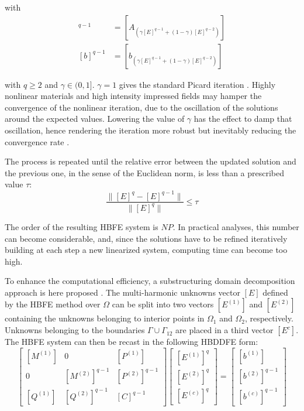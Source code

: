 \documentclass[journal]{IEEEtran}
\begin{document}
\noindent with 
%
\begin{align}
[A]^{q-1} &= [A_{(\gamma [E]^{q-1} + (1-\gamma) [E]^{q-2})}] \\
[b]^{q-1} &= [b_{(\gamma [E]^{q-1} + (1-\gamma) [E]^{q-2})}]
\end{align}

\noindent with $q \geq 2$ and
$\gamma\in(0,1]$. $\gamma=1$ gives the standard Picard iteration \cite{Guarnieri2010}. Highly nonlinear materials and high intensity impressed fields may hamper the convergence of the nonlinear iteration, due to
the oscillation of the solutions around the expected values. Lowering the value
of $\gamma$ has the effect to damp that oscillation, hence rendering the
iteration more robust but inevitably reducing the convergence rate \cite{Silvester1997}.

The process is repeated until the relative error between the updated solution
and the previous one, in the sense of the Euclidean norm, is less than a
prescribed value $\tau$:
%
\begin{equation}
\frac{\|[E]^{q} - [E]^{q-1} \|}{\| [E]^{q} \|} \leq \tau
\end{equation}

The order of the resulting HBFE system is $N P$. In practical analyses, this
number can become considerable, and, since the
solutions have to be refined iteratively building at each step a new linearized
system, computing time can become too high.

To enhance the computational efficiency, a substructuring domain decomposition
approach is here proposed \cite{Saad2000, Toselli2005, Guarnieri2009,
Guarnieri2010}. The multi-harmonic unknowns vector $[E]$ defined by the HBFE method
over $\Omega$ can be split into two vectors $[E^{(1)}]$ and $[E^{(2)}]$
containing the unknowns belonging to interior points in $\Omega_1$ and
$\Omega_2$, respectively. Unknowns belonging to the boundaries
$\Gamma\cup\Gamma_{12}$ are placed in a third vector $[E^c]$. The HBFE system
can then be recast in the following HBDDFE form:
%
\begin{equation}\label{eq:DD}
\begin{bmatrix}
 [M^{(1)}] &  0  &  [P^{(1)}] \\
 0  &  [M^{(2)}]^{q-1} & [P^{(2)}]^{q-1} \\
 [Q^{(1)}] & [Q^{(2)}]^{q-1} & [C]^{q-1}
\end{bmatrix} 
\begin{bmatrix}
{[E^{(1)}]^{q}} \\
{[E^{(2)}]^{q}} \\
{[E^{(c)}]^{q}}
\end{bmatrix} 
=
\begin{bmatrix}
{[b^{(1)}]} \\
{[b^{(2)}]}^{q-1} \\
{[b^{(c)}]}^{q-1}
\end{bmatrix} 
\end{equation}
\end{document}
